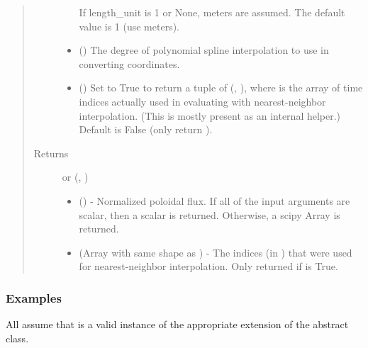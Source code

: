 \documentclass[letterpaper,10pt,english]{sphinxmanual}
\begin{document}
\begin{fulllineitems}
\begin{fulllineitems}
\begin{quote}
\begin{description}
\begin{itemize}
If length\_unit is 1 or None, meters are assumed. The default
value is 1 (use meters).


\item {} 
 () \textendash{} The degree of polynomial spline interpolation to
use in converting coordinates.

\item {} 
 () \textendash{} Set to True to return a tuple of (,
), where  is the array of time indices
actually used in evaluating  with nearest-neighbor
interpolation. (This is mostly present as an internal helper.)
Default is False (only return ).

\end{itemize}

\item[{Returns}] \leavevmode

 or (, )
\begin{itemize}
\item {} 
 () - Normalized poloidal flux.
If all of the input arguments are scalar, then a scalar is
returned. Otherwise, a scipy Array is returned.

\item {} 
 (Array with same shape as ) - The indices
(in ) that were used for
nearest-neighbor interpolation. Only returned if  is
True.

\end{itemize}


\end{description}\end{quote}
\subsubsection*{Examples}

All assume that  is a valid instance of the appropriate
extension of the {\hyperref[\detokenize{eqtools:eqtools.core.Equilibrium}]{}} abstract class.


\end{fulllineitems}
\end{fulllineitems}
\end{document}
